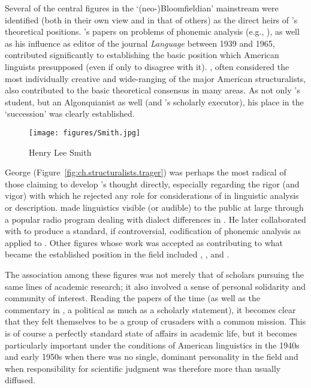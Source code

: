Several of the central figures in the `(neo-)Bloomfieldian' mainstream
were identified (both in their own view and in that of others) as the
direct heirs of {\Bloomfield}'s theoretical positions. 's
papers on problems of phonemic analysis (e.g.,
\citealt{bloch41:overlapping,trager.bloch41:syllabics}), as well as his
influence as editor of the journal \textsl{Language} between 1939 and
1965, contributed significantly to establishing the basic position
which American linguists presupposed (even if only to disagree with
it). , often considered the most individually creative
and wide-ranging of the major American structuralists, also
contributed to the basic theoretical consensus in many areas. As not
only {\Bloomfield}'s student, but an Algonquianist as well (and
{\Bloomfield}'s scholarly executor), his place in the `succession' was
clearly established.

\begin{wrapfigure}[12]{r}{.25\textwidth}
  \texttt{[image: figures/Smith.jpg]}
  \caption{Henry Lee Smith}
  \label{fig:ch.structuralists.smith}
\end{wrapfigure}
George {\Trager} (Figure~\ref{fig:ch.structuralists.trager}) was perhaps
the most radical of those claiming to develop {\Bloomfield}'s thought
directly, especially regarding the rigor (and vigor) with which he
rejected any role for considerations of  in linguistic analysis
or description.  made linguistics visible (or audible)
to the public at large through a popular radio program dealing with
dialect differences in . He later collaborated with
{\Trager} to produce a standard, if controversial, codification of
phonemic analysis as applied to 
\citep{trager.smith51:outline}. Other figures whose work was accepted
as contributing to what became the established position in the field
included , , and .

The association among these figures was not merely that of scholars
pursuing the same lines of academic research; it also involved a sense
of personal solidarity and community of interest. Reading the papers
of the time (as well as the commentary in \citealt{joos57:readings}, a
political as much as a scholarly statement), it becomes clear that
they felt themselves to be a group of crusaders with a common
mission. This is of course a perfectly standard state of affairs in
academic life, but it becomes particularly important under the
conditions of American linguistics in the 1940s and early 1950s when
there was no single, dominant personality in the field and when
responsibility for scientific judgment was therefore more than usually
diffused.


